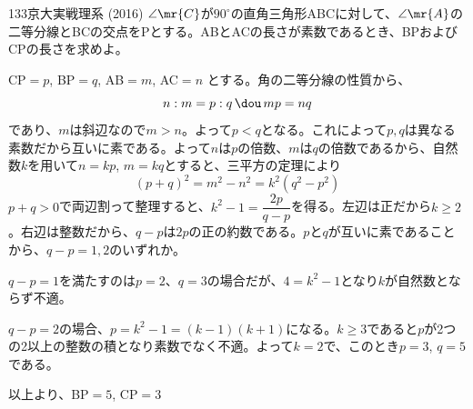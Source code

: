 \begin{prob}{133}{\maru}{京大実戦理系 (2016)}
 $\angle\mr{C}$が$90^\circ$の直角三角形ABCに対して、$\angle\mr{A}$の二等分線とBCの交点をPとする。ABとACの長さが素数であるとき、BPおよびCPの長さを求めよ。
\end{prob}
CP$=p$, BP$=q$, AB$=m$, AC$=n$ とする。角の二等分線の性質から、
\[ n:m=p:q \,\dou\, mp=nq \]
であり、$m$は斜辺なので$m>n$。よって$p<q$となる。これによって$p, q$は異なる素数だから互いに素である。よって$n$は$p$の倍数、$m$は$q$の倍数であるから、自然数$k$を用いて$n=kp$, $m=kq$とすると、三平方の定理により
\[ (p+q)^2=m^2-n^2=k^2(q^2-p^2) \]
$p+q>0$で両辺割って整理すると、$k^2-1=\dfrac{2p}{q-p}$を得る。左辺は正だから$k\ge 2$。右辺は整数だから、$q-p$は$2p$の正の約数である。$p$と$q$が互いに素であることから、$q-p=1, 2$のいずれか。

$q-p=1$を満たすのは$p=2$、$q=3$の場合だが、$4=k^2-1$となり$k$が自然数とならず不適。

$q-p=2$の場合、$p=k^2-1=(k-1)(k+1)$になる。$k\ge 3$であると$p$が2つの2以上の整数の積となり素数でなく不適。よって$k=2$で、このとき$p=3$, $q=5$である。

以上より、BP$=5$, CP$=3$